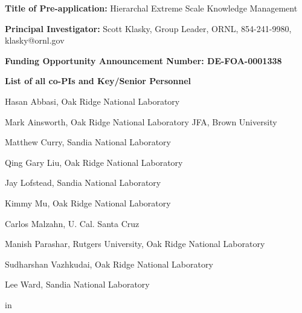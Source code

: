 \documentclass[11pt,letterpaper]{article}
\begin{document}











{\bf Title of Pre-application:} Hierarchal Extreme Scale Knowledge Management \par
{\bf Principal Investigator:} Scott Klasky, Group Leader, ORNL, 854-241-9980, klasky@ornl.gov \par
{\bf Funding Opportunity Announcement Number: DE-FOA-0001338} \par
{\bf List of all co-PIs and Key/Senior Personnel} \par
Hasan Abbasi, Oak Ridge National Laboratory \par
Mark Ainsworth, Oak Ridge National Laboratory JFA, Brown University \par
Matthew Curry, Sandia National Laboratory\par
Qing Gary Liu, Oak Ridge National Laboratory \par
Jay Lofstead, Sandia National Laboratory \par
Kimmy Mu, Oak Ridge National Laboratory \par
Carlos Malzahn, U. Cal. Santa Cruz \par
Manish Parashar, Rutgers University, Oak Ridge National Laboratory \par
Sudharshan Vazhkudai, Oak Ridge National Laboratory \par
Lee Ward, Sandia National Laboratory \par
{} in
\end{document}
